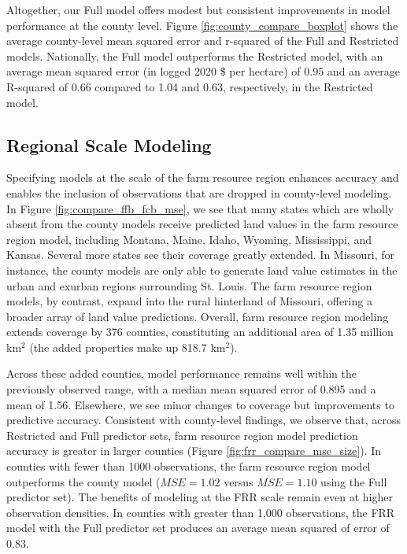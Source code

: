 \documentclass[12pt]{article}
\begin{document}
Altogether, our Full model offers modest but consistent improvements in model performance at the county level. Figure \ref{fig:county_compare_boxplot} shows the average county-level mean squared error and r-squared of the Full and Restricted models. Nationally, the Full model outperforms the Restricted model, with an average mean squared error (in logged 2020 \$ per hectare) of 0.95 and an average R-squared of 0.66 compared to 1.04 and 0.63, respectively, in the Restricted model.

\subsection{Regional Scale Modeling}

Specifying models at the scale of the farm resource region enhances accuracy and enables the inclusion of observations that are dropped in county-level modeling. In Figure \ref{fig:compare_ffb_fcb_mse}, we see that many states which are wholly absent from the county models receive predicted land values in the farm resource region model, including Montana, Maine, Idaho, Wyoming, Mississippi, and Kansas. Several more states see their coverage greatly extended. In Missouri, for instance, the county models are only able to generate land value estimates in the urban and exurban regions surrounding St. Louis. The farm resource region models, by contrast, expand into the rural hinterland of Missouri, offering a broader array of land value predictions. Overall, farm resource region modeling extends coverage by 376 counties, constituting an additional area of 1.35 million km$^2$ (the added properties make up 818.7 km$^2$). 

Across these added counties, model performance remains well within the previously observed range, with a median mean squared error of 0.895 and a mean of 1.56. Elsewhere, we see minor changes to coverage but improvements to predictive accuracy. Consistent with county-level findings, we observe that, across Restricted and Full predictor sets, farm resource region model prediction accuracy is greater in larger counties (Figure \ref{fig:frr_compare_mse_size}). In counties with fewer than 1000 observations, the farm resource region model outperforms the county model ($MSE=1.02$ versus $MSE=1.10$ using the Full predictor set). The benefits of modeling at the FRR scale remain even at higher observation densities. In counties with greater than 1,000 observations, the FRR model with the Full predictor set produces an average mean squared of error of 0.83. 
\end{document}
